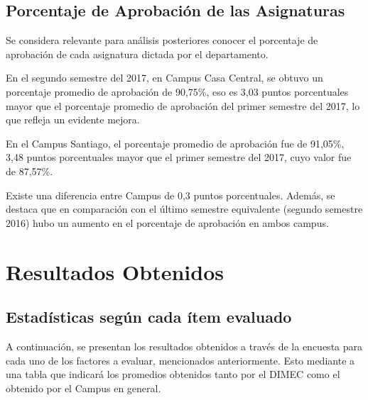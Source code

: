 \documentclass[12pt]{article}
\begin{document}
\subsection{Porcentaje de Aprobación de las Asignaturas}
\begin{text}
Se considera relevante para análisis posteriores conocer el porcentaje de aprobación de cada asignatura dictada por el departamento.  \par
En el segundo semestre del 2017, en Campus Casa Central, se obtuvo un porcentaje promedio de aprobación de 90,75\%, eso es 3,03 puntos porcentuales mayor que el porcentaje promedio de aprobación del primer semestre del 2017, lo que refleja un evidente mejora.\par
En el Campus Santiago, el porcentaje promedio de aprobación fue de 91,05\%, 3,48 puntos porcentuales mayor que el primer semestre del 2017, cuyo valor fue de 87,57\%.\par
Existe una diferencia entre Campus de 0,3 puntos porcentuales. Además, se destaca que en comparación con el último semestre equivalente (segundo semestre 2016) hubo un aumento en el porcentaje de aprobación en ambos campus.\par
\end{text}
\pagebreak


\section{Resultados Obtenidos}

\subsection{Estadísticas según cada ítem evaluado}
\begin{text}
A continuación, se presentan los resultados obtenidos a través de la encuesta para cada uno de los factores a evaluar, mencionados anteriormente. Esto mediante a una tabla que indicará los promedios obtenidos tanto por el DIMEC como el obtenido por el Campus en general. 
\end{text}
\end{document}
